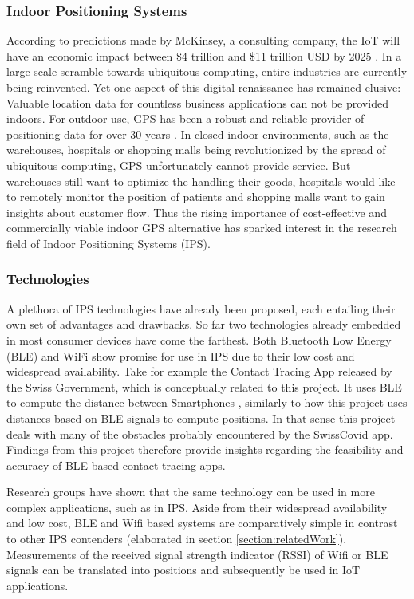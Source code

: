 \documentclass[a4paper, oneside]{ipsreport}
\begin{document}
\subsubsection{Indoor Positioning Systems}
According to predictions made by McKinsey, a consulting company, the IoT will have an economic impact between \$4 trillion and \$11 trillion USD by 2025 \cite{McKinsey}. In a large scale scramble towards ubiquitous computing, entire industries are currently being reinvented. Yet one aspect of this digital renaissance has remained elusive: Valuable location data for countless business applications can not be provided indoors. For outdoor use, GPS has been a robust and reliable provider of positioning data for over 30 years \cite{wiki:GPS}. In closed indoor environments, such as the warehouses, hospitals or shopping malls being revolutionized by the spread of ubiquitous computing, GPS unfortunately cannot provide service. But warehouses still want to optimize the handling their goods, hospitals would like to remotely monitor the position of patients and shopping malls want to gain insights about customer flow. Thus the rising importance of cost-effective and commercially viable indoor GPS alternative has sparked interest in the research field of Indoor Positioning Systems (IPS).

\subsubsection{Technologies}
A plethora of IPS technologies have already been proposed, each entailing their own set of advantages and drawbacks. So far two technologies already embedded in most consumer devices have come the farthest. Both Bluetooth Low Energy (BLE) and WiFi show promise for use in IPS due to their low cost and widespread availability. Take for example the Contact Tracing App released by the Swiss Government, which is conceptually related to this project. It uses BLE to compute the distance between Smartphones \cite{SwissCovid}, similarly to how this project uses distances based on BLE signals to compute positions. In that sense this project deals with many of the obstacles probably encountered by the SwissCovid app. Findings from this project therefore provide insights regarding the feasibility and accuracy of BLE based contact tracing apps.

Research groups have shown that the same technology can be used in more complex applications, such as in IPS. Aside from their widespread availability and low cost, BLE and Wifi based systems are comparatively simple in contrast to other IPS contenders (elaborated in section \ref{section:relatedWork}). Measurements of the received signal strength indicator (RSSI) of Wifi or BLE signals can be translated into positions and subsequently be used in IoT applications.
\end{document}
